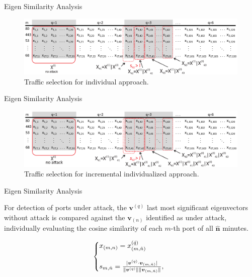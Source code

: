 \documentclass[newPxFont, numfooter, sectionpages]{beamer}
\DeclarePairedDelimiter\abs{\lvert}{\rvert}%
\DeclarePairedDelimiter\norm{\lVert}{\rVert}%
\begin{document}
\begin{frame}{Eigen Similarity Analysis}
	
	\begin{figure}[h!]
	     \includegraphics[width=11.5cm]{../figures/individualized.eps}
	     \caption{Traffic selection for individual approach.}
	     \label{fig:2_fig9}
	\end{figure}
\end{frame}
\begin{frame}{Eigen Similarity Analysis}
	
	\begin{figure}[h!]
	     \includegraphics[width=11.5cm]{../figures/incremental_individualized.eps}
	     \caption{Traffic selection for incremental individualized approach.}
	     \label{fig:2_fig2}
	\end{figure}

\end{frame}
\begin{frame}{Eigen Similarity Analysis}
	
	For detection of ports under attack, the $\boldsymbol{v}^{(q)}$ last most significant eigenvectors without attack is compared against the $\boldsymbol{v}_{(n)}$ identified as under attack, individually evaluating the cosine similarity of each $m$-th port of all $\boldsymbol{\hat{n}}$ minutes.


	\begin{equation}\label{eq:eq15}
		\left\{
		\begin{array}{@{}ll@{}}
			x_{(m,n)} = x^{(\hat{q})}_{(m,\hat{n})} \\
			\\
			s_{m,\hat{n}} = \frac{\abs{\boldsymbol{v}^{(q)} \cdot \boldsymbol{v}_{(m,\hat{n})}}}{\norm{\boldsymbol{v}^{(q)}}\norm{\boldsymbol{v}_{(m,\hat{n})}}},
		\end{array}\right.
	\end{equation}

\end{frame}
\end{document}
